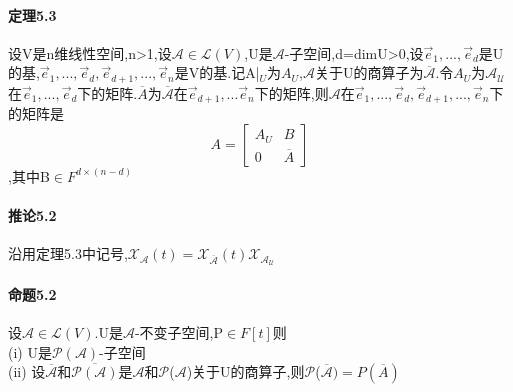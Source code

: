 \documentclass{ctexart}
\begin{document}
\paragraph{定理5.3}
设V是n维线性空间,n>1,设$\mathcal{A}\in \mathcal{L}(V)$,U是$\mathcal{A}$-子空间,d=dimU>0,设$\vec{e}_{1},...,\vec{e}_{d}$是U的基,$\vec{e}_{1},...,\vec{e}_{d},\vec{e}_{d+1},...,\vec{e}_{n}$是V的基.记A|$_{U}$为$A_{U}$,$\mathcal{A}$关于U的商算子为$\overline{\mathcal{A}}$.令$A_{U}$为$\mathcal{A_{U}}$在$\vec{e}_{1},...,\vec{e}_{d}$下的矩阵.$\overline{A}$为$\overline{\mathcal{A}}$在$\vec{e}_{d+1},...\vec{e}_{n}$下的矩阵,则$\mathcal{A}$在$\vec{e}_{1},...,\vec{e}_{d},\vec{e}_{d+1},...,\vec{e}_{n}$下的矩阵是\\
\begin{equation}
A=
\left[ \begin{array}{cc}
A_{U} & B\\
0 & \overline{A}
\end{array} 
\right]
\end{equation},其中B$\in F^{d\times(n-d)}$
\paragraph{推论5.2}
沿用定理5.3中记号,$\mathcal{X_{\mathcal{A}}}(t)=\mathcal{X_{\overline{A}}}(t)\mathcal{X_{\mathcal{A_{U}}}}$
\paragraph{命题5.2}
设$\mathcal{A}\in\mathcal{L}(V)$.U是$\mathcal{A}$-不变子空间,P$\in F[t]$则\\
(i) U是$\mathcal{P}(\mathcal{A})$-子空间\\
(ii) 设$\overline{\mathcal{A}}$和$\mathcal{\overline{P(\mathcal{A})}}$是$\mathcal{A}$和$\mathcal{P}$($\mathcal{A}$)关于U的商算子,则$\mathcal{P}$($\overline{\mathcal{A}})=P(\overline{A})$
\end{document}
